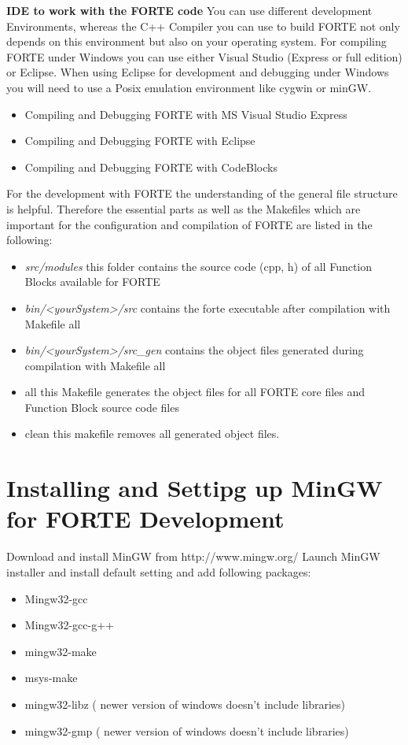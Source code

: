 \textbf{IDE to work with the FORTE code}
You can use different development Environments, whereas the C++ Compiler you can use to build FORTE not only depends on this environment but also on your operating system. For compiling FORTE under Windows you can use either Visual Studio (Express or full edition) or Eclipse. When using Eclipse for development and debugging under Windows you will need to use a Posix emulation environment like cygwin or minGW.
\begin{itemize}
	\item Compiling and Debugging FORTE with MS Visual Studio Express
	\item Compiling and Debugging FORTE with Eclipse
	\item Compiling and Debugging FORTE with CodeBlocks
\end{itemize}

For the development with FORTE the understanding of the general file structure is helpful. Therefore the essential parts as well as the Makefiles which are important for the configuration and compilation of FORTE are listed in the following:
\begin{itemize}
	\item \textsl{src/modules} this folder contains the source code (cpp, h) of all Function Blocks available for FORTE
	\item \textsl{bin/<yourSystem>/src} contains the forte executable after compilation with Makefile all
	\item \textsl{bin/<yourSystem>/src\_gen} contains the object files generated during compilation with Makefile all
	\item all this Makefile generates the object files for all FORTE core files and Function Block source code files
	\item clean this makefile removes all generated object files.
\end{itemize}


\section{Installing and Settipg up MinGW for FORTE Development}

Download and install MinGW from http://www.mingw.org/
Launch MinGW installer and install default setting and add following packages:

\begin{itemize}
	\item Mingw32-gcc
	\item Mingw32-gcc-g++
	\item mingw32-make
	\item msys-make 
	\item mingw32-libz ( newer version of windows doesn’t include libraries)
	\item mingw32-gmp ( newer version of windows doesn’t include libraries)	
\end{itemize}


